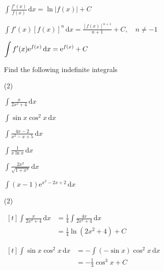 \documentclass[11pt,a4paper]{book}
\begin{document}
\begin{tcolorbox}[colback=blue!5, colframe=black, boxrule=.4pt, sharpish corners]

\begin{tasks}[style=itemize,label-width=3.5ex,column-sep=-1cm]

\task ${\displaystyle \int\frac{f'(x)}{f(x)}\, \mathrm{d}x=\ln\left|f(x)\right|+C}$

\task ${\displaystyle \int f'(x)[f(x)]^{n}\, \mathrm{d}x=\frac{[f(x)]^{n+1}}{n+1}+C,\quad n\neq-1}$

\task ${\displaystyle \int f'(x){\rm e}^{f(x)}\, \mathrm{d}x={\rm e}^{f(x)}+C}$

\end{tasks}
\end{tcolorbox}

\begin{example}

Find the following indefinite integrals

\begin{tasks}[label=(\alph*),label-width=3.5ex](2)

\task ${\displaystyle \int\frac{x}{2x^{2}+4}\, \mathrm{d}x}$

\task ${\displaystyle \int\sin x\cos^{2}x\, \mathrm{d}x}$

\task  ${\displaystyle \int\frac{4x-2}{x^{2}-x+5}\, \mathrm{d}x}$

\task  ${\displaystyle \int\frac{1}{x\ln x}\, \mathrm{d}x}$

\task ${\displaystyle \int\frac{2x^{2}}{\sqrt{1+x^{3}}}\, \mathrm{d}x}$

\task ${\displaystyle \int(x-1)\mathrm{e}^{x^{2}-2x+2}\, \mathrm{d}x}$

\end{tasks}

\Solution

\begin{tasks}[label=(\alph*),label-width=3.5ex,after-item-skip = 1cm](2)

\task
$
\begin{aligned}[t]
{\displaystyle \int\frac{x}{2x^{2}+4}\, \mathrm{d}x} & =\frac{1}{4}{\displaystyle \int\frac{4x}{2x^{2}+4}\, \mathrm{d}x}\\
 & =\frac{1}{4}\ln\left(2x^{2}+4\right)+C
\end{aligned}
$

\task
$
\begin{aligned}[t]
{\displaystyle \int\sin x\cos^{2}x\, \mathrm{d}x} & ={\displaystyle -\int\left(-\sin x\right)\cos^{2}x\, \mathrm{d}x}\\
 & =-\frac{1}{3}\cos^{3}x+C
\end{aligned}
$


\end{tasks}
\end{example}
\end{document}
